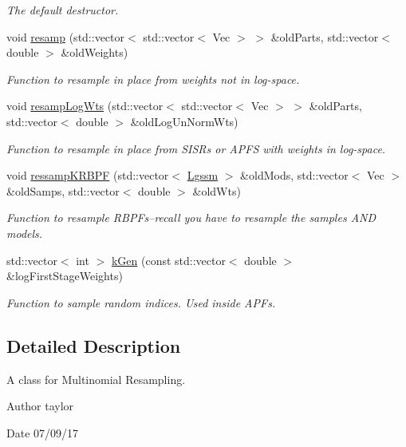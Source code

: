 \begin{DoxyCompactItemize}
\begin{DoxyCompactList}\small\item\em The default destructor. \end{DoxyCompactList}\item 
void \hyperlink{classMultinomResamp_a0c24d6d59254855421b8ae13b2ebbcd9}{resamp} (std\+::vector$<$ std\+::vector$<$ Vec $>$ $>$ \&old\+Parts, std\+::vector$<$ double $>$ \&old\+Weights)
\begin{DoxyCompactList}\small\item\em Function to resample in place from weights {\itshape not} in log-\/space. \end{DoxyCompactList}\item 
void \hyperlink{classMultinomResamp_a0ea6269180faf0b0613072d9bc8a7b53}{resamp\+Log\+Wts} (std\+::vector$<$ std\+::vector$<$ Vec $>$ $>$ \&old\+Parts, std\+::vector$<$ double $>$ \&old\+Log\+Un\+Norm\+Wts)
\begin{DoxyCompactList}\small\item\em Function to resample in place from S\+I\+S\+Rs or A\+P\+FS with weights in log-\/space. \end{DoxyCompactList}\item 
void \hyperlink{classMultinomResamp_ad39c4f5d5460e3e4a2c56370c8dab39f}{ressamp\+K\+R\+B\+PF} (std\+::vector$<$ \hyperlink{classLgssm}{Lgssm} $>$ \&old\+Mods, std\+::vector$<$ Vec $>$ \&old\+Samps, std\+::vector$<$ double $>$ \&old\+Wts)
\begin{DoxyCompactList}\small\item\em Function to resample R\+B\+P\+Fs--recall you have to resample the samples A\+ND models. \end{DoxyCompactList}\item 
std\+::vector$<$ int $>$ \hyperlink{classMultinomResamp_ad29946389803294445cb27e74d949cd5}{k\+Gen} (const std\+::vector$<$ double $>$ \&log\+First\+Stage\+Weights)
\begin{DoxyCompactList}\small\item\em Function to sample random indices. Used inside A\+P\+Fs. \end{DoxyCompactList}\end{DoxyCompactItemize}


\subsection{Detailed Description}
A class for Multinomial Resampling. 

\begin{DoxyAuthor}{Author}
taylor 
\end{DoxyAuthor}
\begin{DoxyDate}{Date}
07/09/17 
\end{DoxyDate}


